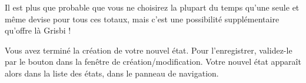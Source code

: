Il est plus que probable que vous ne choisirez la plupart du temps qu'une seule et même devise pour tous ces totaux, mais c'est une possibilité supplémentaire qu'offre là Grisbi !

Vous avez terminé la création de votre nouvel état. Pour l'enregistrer, validez-le par le bouton  dans la fenêtre de création/modification. Votre nouvel état apparaît alors dans la liste des états, dans le panneau de navigation.